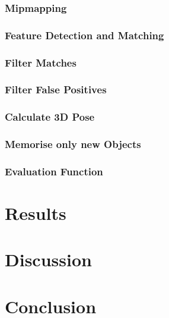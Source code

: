 \documentclass[11pt, twoside, a4paper]{report}
\begin{document}
\subsection{Mipmapping}
\subsection{Feature Detection and Matching}
\subsection{Filter Matches}
\subsection{Filter False Positives}
\subsection{Calculate 3D Pose}
\subsection{Memorise only new Objects}
\subsection{Evaluation Function}


\chapter{Results}


\chapter{Discussion}


\chapter{Conclusion}
\end{document}
